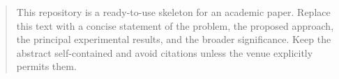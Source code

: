 \begin{abstract}
This repository is a ready-to-use skeleton for an academic paper. Replace this text with a concise statement of the problem, the proposed approach, the principal experimental results, and the broader significance. Keep the abstract self-contained and avoid citations unless the venue explicitly permits them.
\end{abstract}
